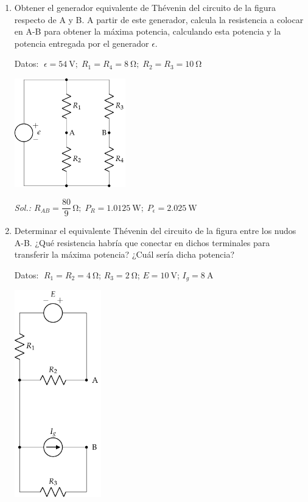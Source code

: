 \begin{enumerate}
\item Obtener el generador equivalente de Thévenin del circuito de la
  figura respecto de A y B. A partir de este generador, calcula la
  resistencia a colocar en A-B para obtener la máxima potencia,
  calculando esta potencia y la potencia entregada por el generador
  $\epsilon$.

  Datos:
  $\; \epsilon = \qty{54}{\volt};\; R_1 = R_4 = \qty{8}{\ohm};\;
  R_2 = R_3 = \qty{10}{\ohm}$

    \vspace{-1mm}
  \begin{center}
    \includegraphics[height=4.75cm]{../figs/Thevenin2}
  \end{center}

    \vspace{-2mm}
    \emph{Sol.:\;
      $R_{AB} = \dfrac{80}{9}\,\si{\ohm}; \; P_R = \qty{1.0125}{\watt}; \;
      P_\epsilon = \qty{2.025}{\watt}$}


  \item Determinar el equivalente Thévenin del circuito de la figura
    entre los nudos A-B. ¿Qué resistencia habría que conectar en
    dichos terminales para transferir la máxima potencia? ¿Cuál sería
    dicha potencia?

    Datos: $\; R_1 = R_2 = \qty{4}{\ohm}$;\; $R_3 = \qty{2}{\ohm}$;\; $E = \qty{10}{\volt}$;\; $I_g = \qty{8}{\ampere}$

    \vspace{-3mm}
    \begin{center}
      \includegraphics[height=9cm]{../figs/ej17_BT1.pdf}
    \end{center}


\end{enumerate}
